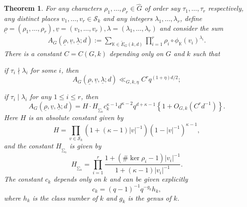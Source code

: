 \documentclass[12pt]{amsart}
\theoremstyle{plain}
\newtheorem{thm}{Theorem}
\begin{document}
\begin{thm} \label{3:rho} For any characters $\rho_1,\ldots,\rho_r \in \widehat{G}$ of order say $\tau_1,\ldots,\tau_r$ respectively, any distinct places $v_1,\ldots,v_r \in {\mathcal{S}_k}$ and any integers $\lambda_1,\ldots,\lambda_r$, define ${\underline{{\rho}}}=(\rho_1,\ldots,\rho_r),{\underline{{v}}}=(v_1,\ldots,v_r),
\lambda=(\lambda_1,\ldots,\lambda_r)$ and consider the sum
\begin{eqnarray} \label{3:A}
{A_{G}({\underline{{\rho}}},{\underline{{v}}},{\underline{{\lambda}}};d)}:=\sum_{{{\mathbb K}} \in \widetilde{E}_G(k,d) } \prod_{i=1}^r \rho_i \circ {\phi_{{\mathbb K}}}\left(v_i\right)^{\lambda_i}.
\end{eqnarray}
There is a constant $C=C(G,k)$ depending only on $G$ and $k$ such that

 if $\tau_i \nmid \lambda_i$ for some $i$, then
\[ {A_{G}({\underline{{\rho}}},{\underline{{v}}},{\underline{{\lambda}}};d)} \ll_{G,k,\eta} C^{r} q^{(1+\eta)d/{2}};\]

 if $\tau_i \mid \lambda_i$ for any $1 \le i \le r$, then
\[{A_{G}({\underline{{\rho}}},{\underline{{v}}},{\underline{{\lambda}}};d)}=H \cdot  H_{_{\sum_0}}c_k^{\kappa-1}d^{\kappa-2} q^{d+\kappa-1} \left\{1+O_{G,k}\left(C^rd^{-1}\right)\right\}. \]
Here $H$ is an absolute constant given by
\[H=\prod_{v \in {\mathcal{S}_k}}\left(1+(\kappa-1)|v|^{-1}\right)
\left(1-|v|^{-1}\right)^{\kappa-1},\]
and the constant $H_{_{\sum_0}}$ is given by
\[H_{_{\sum_0}}=\prod_{i=1}^r \frac{1+(\#\ker \rho_i-1)|v_i|^{-1}}{
1+(\kappa-1)|v_i|^{-1}}.\]
The constant $c_k$ depends only on $k$ and can be given explicitly
\[c_k={(q-1)^{-1}q^{-g_k}}h_k,\]
where $h_k$ is the class number of $k$ and $g_k$ is the genus of $k$.

\end{thm}
\end{document}
